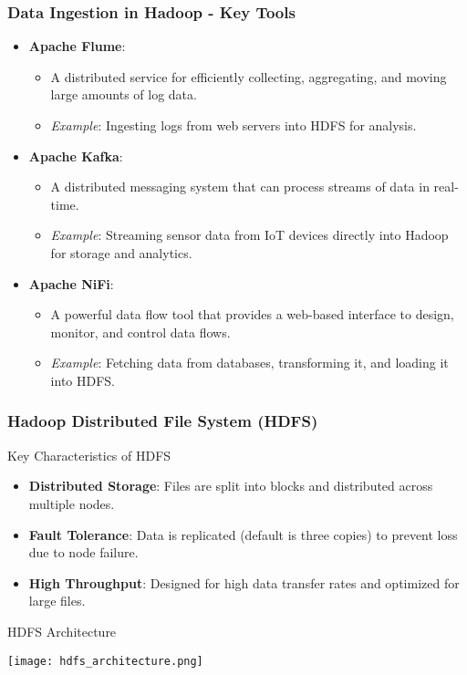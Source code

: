 \documentclass[aspectratio=169]{beamer}
\begin{document}
\begin{frame}[fragile]
    \frametitle{Data Ingestion in Hadoop - Key Tools}
    \begin{itemize}
        \item \textbf{Apache Flume}:
        \begin{itemize}
            \item A distributed service for efficiently collecting, aggregating, and moving large amounts of log data.
            \item \textit{Example}: Ingesting logs from web servers into HDFS for analysis.
        \end{itemize}
        
        \item \textbf{Apache Kafka}:
        \begin{itemize}
            \item A distributed messaging system that can process streams of data in real-time.
            \item \textit{Example}: Streaming sensor data from IoT devices directly into Hadoop for storage and analytics.
        \end{itemize}
        
        \item \textbf{Apache NiFi}:
        \begin{itemize}
            \item A powerful data flow tool that provides a web-based interface to design, monitor, and control data flows.
            \item \textit{Example}: Fetching data from databases, transforming it, and loading it into HDFS.
        \end{itemize}
    \end{itemize}
\end{frame}

\begin{frame}[fragile]
    \frametitle{Hadoop Distributed File System (HDFS)}
    \begin{block}{Key Characteristics of HDFS}
        \begin{itemize}
            \item \textbf{Distributed Storage}: Files are split into blocks and distributed across multiple nodes.
            \item \textbf{Fault Tolerance}: Data is replicated (default is three copies) to prevent loss due to node failure.
            \item \textbf{High Throughput}: Designed for high data transfer rates and optimized for large files.
        \end{itemize}
    \end{block}
    
    \begin{block}{HDFS Architecture}
        \begin{center}
            \texttt{[image: hdfs\_architecture.png]} %
        \end{center}
    \end{block}
\end{frame}
\end{document}
